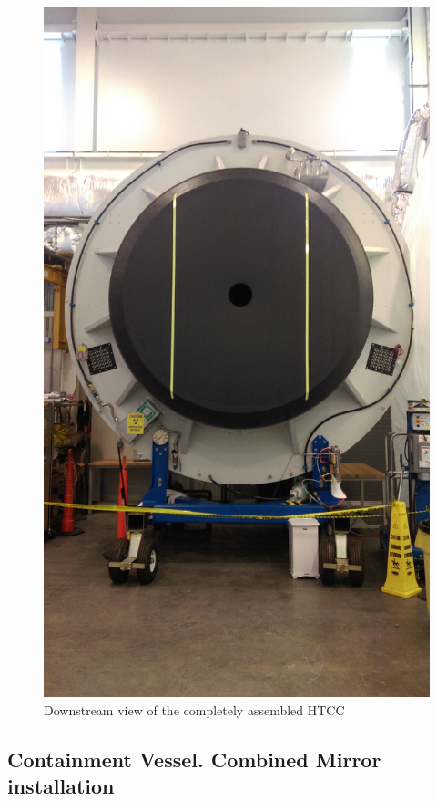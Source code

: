 \begin{figure}[ht]
    \centering
    \includegraphics[width=1.0\linewidth,trim={0 25cm 0 500},clip]{images/Exit_Win.jpg}
    \caption{Downstream view of the completely assembled HTCC}
    \label{fig:Exit_Win}
\end{figure}

\subsection{Containment Vessel. Combined Mirror installation}


